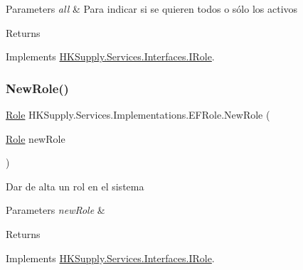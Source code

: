 \begin{DoxyParams}{Parameters}
{\em all} & Para indicar si se quieren todos o sólo los activos\\
\hline
\end{DoxyParams}
\begin{DoxyReturn}{Returns}

\end{DoxyReturn}


Implements \mbox{\hyperlink{interface_h_k_supply_1_1_services_1_1_interfaces_1_1_i_role}{H\+K\+Supply.\+Services.\+Interfaces.\+I\+Role}}.

\mbox{\label{class_h_k_supply_1_1_services_1_1_implementations_1_1_e_f_role_a549317ad8c8fb3353382a8cd36fa1b22}} 
\subsubsection{\texorpdfstring{New\+Role()}{NewRole()}}
{\footnotesize\ttfamily \mbox{\hyperlink{class_h_k_supply_1_1_models_1_1_role}{Role}} H\+K\+Supply.\+Services.\+Implementations.\+E\+F\+Role.\+New\+Role (\begin{DoxyParamCaption}\item[{\mbox{\hyperlink{class_h_k_supply_1_1_models_1_1_role}{Role}}}]{new\+Role }\end{DoxyParamCaption})}



Dar de alta un rol en el sistema 


\begin{DoxyParams}{Parameters}
{\em new\+Role} & \\
\hline
\end{DoxyParams}
\begin{DoxyReturn}{Returns}

\end{DoxyReturn}


Implements \mbox{\hyperlink{interface_h_k_supply_1_1_services_1_1_interfaces_1_1_i_role}{H\+K\+Supply.\+Services.\+Interfaces.\+I\+Role}}.

\mbox{\label{class_h_k_supply_1_1_services_1_1_implementations_1_1_e_f_role_a2d880fce95c33f7581f2e3310ca943ed}} 
